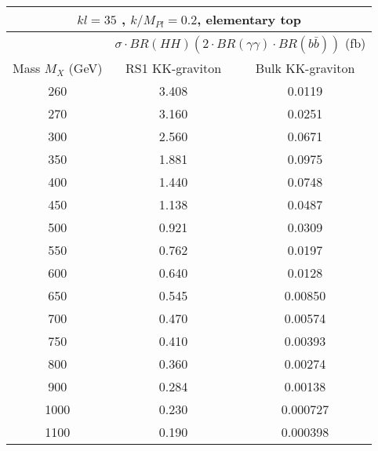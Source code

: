 \begin{tabular}{|c|cc|}
\hline
\multicolumn{3}{|c|}{ $kl = 35$ , $k/M_{Pl} = 0.2$, elementary top }\\ \hline \hline
 & \multicolumn{2}{c|}{ $\sigma \cdot BR(HH) (2 \cdot BR(\gamma\gamma) \cdot BR(b\bar{b}))$ (fb) }\\ %
 Mass $M_X$ (GeV) & RS1 KK-graviton  & Bulk KK-graviton \\ \hline
260     & 3.408 & 0.0119 \\
270     & 3.160 & 0.0251 \\
300     & 2.560 & 0.0671 \\
350     & 1.881 & 0.0975 \\
400     & 1.440 & 0.0748 \\
450     & 1.138 & 0.0487 \\
500     & 0.921 & 0.0309 \\
550     & 0.762 & 0.0197 \\
600     & 0.640 & 0.0128 \\
650     & 0.545 & 0.00850 \\
700     & 0.470 & 0.00574 \\
750     & 0.410 & 0.00393 \\
800     & 0.360 & 0.00274 \\
900     & 0.284 & 0.00138 \\
1000    & 0.230 & 0.000727 \\
1100    & 0.190 & 0.000398 \\
\hline
\end{tabular}
